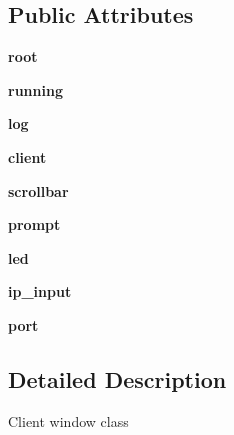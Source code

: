 \subsection*{\-Public \-Attributes}
\begin{DoxyCompactItemize}
\item 
\hypertarget{classgui_1_1_client_u_i_a82b9e023d168f8f0d83b27f0047a24c3}{{\bfseries root}}\label{classgui_1_1_client_u_i_a82b9e023d168f8f0d83b27f0047a24c3}

\item 
\hypertarget{classgui_1_1_client_u_i_a1da08e6aeecb566939779ca01c601294}{{\bfseries running}}\label{classgui_1_1_client_u_i_a1da08e6aeecb566939779ca01c601294}

\item 
\hypertarget{classgui_1_1_client_u_i_a894c35624fb51ca6235af0bf4293aa6e}{{\bfseries log}}\label{classgui_1_1_client_u_i_a894c35624fb51ca6235af0bf4293aa6e}

\item 
\hypertarget{classgui_1_1_client_u_i_adad2c9f8e95a8e14b26d58e8dba90ae9}{{\bfseries client}}\label{classgui_1_1_client_u_i_adad2c9f8e95a8e14b26d58e8dba90ae9}

\item 
\hypertarget{classgui_1_1_client_u_i_a97ff220633d3e73e5d9389494777eb91}{{\bfseries scrollbar}}\label{classgui_1_1_client_u_i_a97ff220633d3e73e5d9389494777eb91}

\item 
\hypertarget{classgui_1_1_client_u_i_acf3967625dc38a6a2f659208644e62f7}{{\bfseries prompt}}\label{classgui_1_1_client_u_i_acf3967625dc38a6a2f659208644e62f7}

\item 
\hypertarget{classgui_1_1_client_u_i_a9cb33bb15518b85d9014241671807cd4}{{\bfseries led}}\label{classgui_1_1_client_u_i_a9cb33bb15518b85d9014241671807cd4}

\item 
\hypertarget{classgui_1_1_client_u_i_a71b14dd3e70ec63438ee6998903d9a7f}{{\bfseries ip\-\_\-input}}\label{classgui_1_1_client_u_i_a71b14dd3e70ec63438ee6998903d9a7f}

\item 
\hypertarget{classgui_1_1_client_u_i_aa724798549b9e514b1481c50498a1a9a}{{\bfseries port}}\label{classgui_1_1_client_u_i_aa724798549b9e514b1481c50498a1a9a}

\end{DoxyCompactItemize}


\subsection{\-Detailed \-Description}
\begin{DoxyVerb}Client window class \end{DoxyVerb}
 


